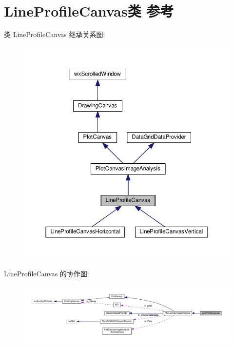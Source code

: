 \hypertarget{class_line_profile_canvas}{\section{Line\+Profile\+Canvas类 参考}
\label{class_line_profile_canvas}
}


类 Line\+Profile\+Canvas 继承关系图\+:
\nopagebreak
\begin{figure}[H]
\begin{center}
\leavevmode
\includegraphics[width=350pt]{class_line_profile_canvas__inherit__graph}
\end{center}
\end{figure}


Line\+Profile\+Canvas 的协作图\+:
\nopagebreak
\begin{figure}[H]
\begin{center}
\leavevmode
\includegraphics[width=350pt]{class_line_profile_canvas__coll__graph}
\end{center}
\end{figure}
